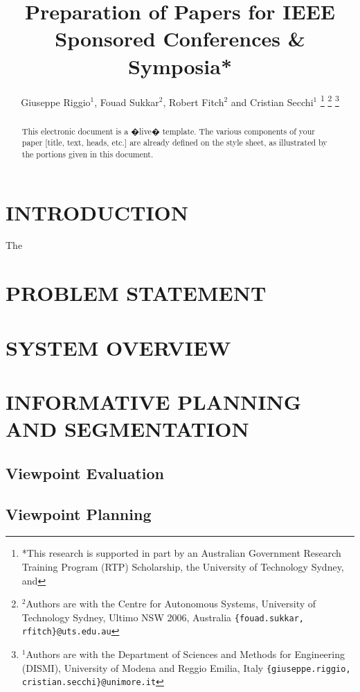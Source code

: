 \documentclass[letterpaper, 10 pt, conference]{ieeeconf}  %
\title{\LARGE \bf
Preparation of Papers for IEEE Sponsored Conferences \& Symposia*
}
\author{Giuseppe Riggio$^{1}$, Fouad Sukkar$^{2}$, Robert Fitch$^{2}$ and Cristian Secchi$^{1}$%
\thanks{*This research is supported in part by an Australian Government Research Training Program (RTP) Scholarship, the University of Technology Sydney, and}%
\thanks{$^2$Authors are with the Centre for Autonomous Systems, University of Technology Sydney, Ultimo NSW 2006, Australia {\tt\footnotesize\{fouad.sukkar, rfitch\}@uts.edu.au}}%
\thanks{$^{1}$Authors are with the Department of Sciences and Methods for
Engineering (DISMI), University of Modena and Reggio Emilia, Italy
{\tt\small{\{giuseppe.riggio, cristian.secchi\}@unimore.it}}}%
}
\theoremstyle{prop}
\begin{document}
\maketitle
\thispagestyle{empty}
\pagestyle{empty}


\begin{abstract}

This electronic document is a �live� template. The various components of your paper [title, text, heads, etc.] are already defined on the style sheet, as illustrated by the portions given in this document.

\end{abstract}


\section{INTRODUCTION}
The~\cite{best2018decmcts}

\section{PROBLEM STATEMENT}

\section{SYSTEM OVERVIEW}

\section{INFORMATIVE PLANNING AND SEGMENTATION}
\subsection{Viewpoint Evaluation}

\subsection{Viewpoint Planning}
\end{document}
